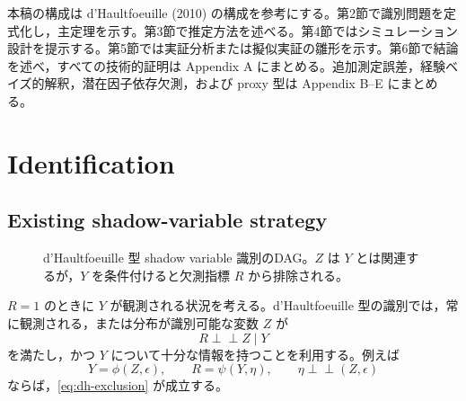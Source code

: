 \documentclass[10pt,a4paper]{article}
\newcommand{\indep}{\mathrel{\perp\!\!\!\perp}}
\newcommand{\1}{\mathbf{1}}
\begin{document}
本稿の構成は d'Haultfoeuille (2010) の構成を参考にする。第2節で識別問題を定式化し，主定理を示す。第3節で推定方法を述べる。第4節ではシミュレーション設計を提示する。第5節では実証分析または擬似実証の雛形を示す。第6節で結論を述べ，すべての技術的証明は Appendix A にまとめる。追加測定誤差，経験ベイズ的解釈，潜在因子依存欠測，および proxy 型は Appendix B--E にまとめる。

\section{Identification}

\subsection{Existing shadow-variable strategy}

\begin{figure}[tbp]
\centering
{}
\caption{d'Haultfoeuille 型 shadow variable 識別のDAG。$Z$ は $Y$ とは関連するが，$Y$ を条件付けると欠測指標 $R$ から排除される。}
\label{fig:dag-dhaultfoeuille}
\end{figure}

$R=1$ のときに $Y$ が観測される状況を考える。d'Haultfoeuille 型の識別では，常に観測される，または分布が識別可能な変数 $Z$ が
\begin{equation}
  R\indep Z\mid Y
  \label{eq:dh-exclusion}
\end{equation}
を満たし，かつ $Y$ について十分な情報を持つことを利用する。例えば
\begin{equation}
  Y=\phi(Z,\epsilon),\qquad R=\psi(Y,\eta),\qquad \eta\indep (Z,\epsilon)
\end{equation}
ならば，\eqref{eq:dh-exclusion} が成立する。
\end{document}
